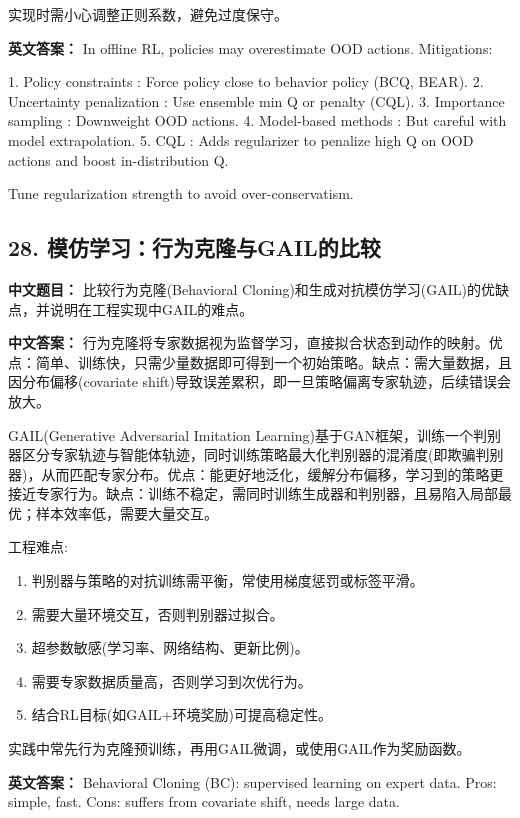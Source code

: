 \documentclass[10pt,a4paper]{ctexart}
\begin{document}
实现时需小心调整正则系数，避免过度保守。

\textbf{英文答案：}  
In offline RL, policies may overestimate OOD actions. Mitigations:

1.  Policy constraints : Force policy close to behavior policy (BCQ, BEAR).
2.  Uncertainty penalization : Use ensemble min Q or penalty (CQL).
3.  Importance sampling : Downweight OOD actions.
4.  Model-based methods : But careful with model extrapolation.
5.  CQL : Adds regularizer to penalize high Q on OOD actions and boost in-distribution Q.

Tune regularization strength to avoid over-conservatism.

\subsection*{28. 模仿学习：行为克隆与GAIL的比较}
\textbf{中文题目：} 比较行为克隆(Behavioral Cloning)和生成对抗模仿学习(GAIL)的优缺点，并说明在工程实现中GAIL的难点。

\textbf{中文答案：}  
行为克隆将专家数据视为监督学习，直接拟合状态到动作的映射。优点：简单、训练快，只需少量数据即可得到一个初始策略。缺点：需大量数据，且因分布偏移(covariate shift)导致误差累积，即一旦策略偏离专家轨迹，后续错误会放大。

GAIL(Generative Adversarial Imitation Learning)基于GAN框架，训练一个判别器区分专家轨迹与智能体轨迹，同时训练策略最大化判别器的混淆度(即欺骗判别器)，从而匹配专家分布。优点：能更好地泛化，缓解分布偏移，学习到的策略更接近专家行为。缺点：训练不稳定，需同时训练生成器和判别器，且易陷入局部最优；样本效率低，需要大量交互。

 工程难点:
\begin{enumerate}
    \item 判别器与策略的对抗训练需平衡，常使用梯度惩罚或标签平滑。
    \item 需要大量环境交互，否则判别器过拟合。
    \item 超参数敏感(学习率、网络结构、更新比例)。
    \item 需要专家数据质量高，否则学习到次优行为。
    \item 结合RL目标(如GAIL+环境奖励)可提高稳定性。
\end{enumerate}

实践中常先行为克隆预训练，再用GAIL微调，或使用GAIL作为奖励函数。

\textbf{英文答案：}  
Behavioral Cloning (BC): supervised learning on expert data. Pros: simple, fast. Cons: suffers from covariate shift, needs large data.
\end{document}
